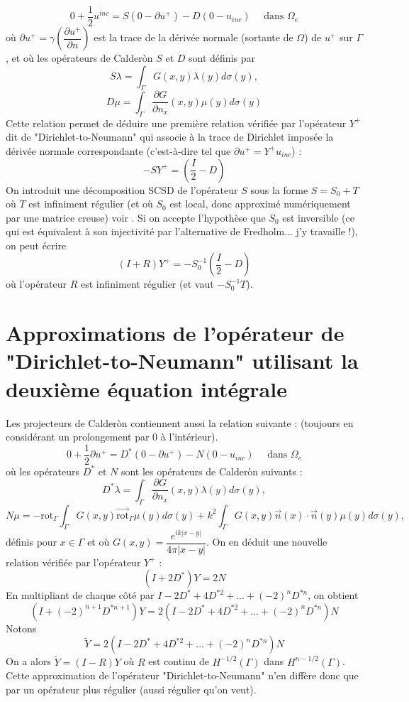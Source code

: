\documentclass[11pt,a4paper]{article}
\begin{document}
\begin{equation}
0 + \dfrac{1}{2}u^{inc} = S(0-\partial u^+)  - D (0-u_{inc}) \quad \text{ dans $\Omega_e$}
\label{RepresentationIntegrale1}
\end{equation}
où $\partial u^+ = \gamma\left( \dfrac{\partial u^+}{\partial n}\right)$ est la trace de la dérivée normale (sortante de $\Omega$) de $u^+$ sur $\Gamma$, et où les opérateurs de Calderòn $S$ et $D$ sont définis par 
\[S\lambda = \int_{\Gamma} G(x,y)\lambda(y)d\sigma(y),\]
\[D\mu = \int_{\Gamma} \dfrac{\partial G}{\partial n_x}(x,y)\mu(y)d\sigma(y)\]
Cette relation permet de déduire une première relation vérifiée par l'opérateur $Y^+$ dit de "Dirichlet-to-Neumann" qui associe à la trace de Dirichlet imposée la dérivée normale correspondante (c'est-à-dire tel que $\partial u^+ = Y^+ u_{inc}$) :
\[-SY^+ = \left(\dfrac{I}{2}-D\right)\]
On introduit une décomposition SCSD de l'opérateur $S$ sous la forme $S = S_0 + T$ où $T$ est infiniment régulier (et où $S_0$ est local, donc approximé numériquement par une matrice creuse) voir \cite{alouges2015sparse}. Si on accepte l'hypothèse que $S_0$ est inversible (ce qui est équivalent à son injectivité par l'alternative de Fredholm... j'y travaille !), on peut écrire 
\[(I+R)Y^{+} = -S_0^{-1}\left(\dfrac{I}{2}-D\right)\]
où l'opérateur $R$ est infiniment régulier (et vaut $-S_0^{-1}T$). 

\section{Approximations de l'opérateur de "Dirichlet-to-Neumann" utilisant la deuxième équation intégrale}

Les projecteurs de Calderòn contiennent aussi la relation suivante : (toujours en considérant un prolongement par $0$ à l'intérieur). 
\begin{equation}
0 + \dfrac{1}{2}\partial u^+ = D^*\left(0-\partial u^+\right) - N (0-u_{inc}) \quad \text{ dans $\Omega_e$}
\label{RepresentationIntegrale2}
\end{equation}
où les opérateurs $D^*$ et $N$ sont les opérateurs de Calderòn suivants :
\[D^*\lambda = \int_{\Gamma} \dfrac{\partial G}{\partial n_x}(x,y)\lambda(y)d\sigma(y),\]
\[N\mu = -\text{rot}_{\Gamma}\int_{\Gamma} G(x,y)\overrightarrow{\text{rot}}_{\Gamma}\mu(y)d\sigma(y) + k^2 \int_{\Gamma}G(x,y)\overrightarrow{n}(x)\cdot \overrightarrow{n}(y)\mu(y)d\sigma(y),\]
définis pour $x \in \Gamma$ et où $G(x,y) = \dfrac{e^{ik|x-y|}}{4\pi |x-y|}$. 
On en déduit une nouvelle relation vérifiée par l'opérateur $Y^+$ : 
\[\left(I+2D^*\right)Y = 2N\]
En multipliant de chaque côté par $I-2D^*+4D^{*2} + ... + (-2)^nD^{*n}$, on obtient
\[\left(I+(-2)^{n+1}D^{*n+1}\right)Y = 2\left(I-2D^*+4D^{*2} + ... + (-2)^nD^{*n}\right)N\]
Notons 
\[\tilde{Y} = 2\left(I-2D^*+4D^{*2} + ... + (-2)^nD^{*n}\right)N\]
On a alors $\tilde{Y} = (I - R)Y$ où $R$ est continu de $H^{-1/2}(\Gamma)$ dans $H^{n-1/2}(\Gamma)$. 
Cette approximation de l'opérateur "Dirichlet-to-Neumann" n'en diffère donc que par un opérateur plus régulier (aussi régulier qu'on veut). 
\end{document}
